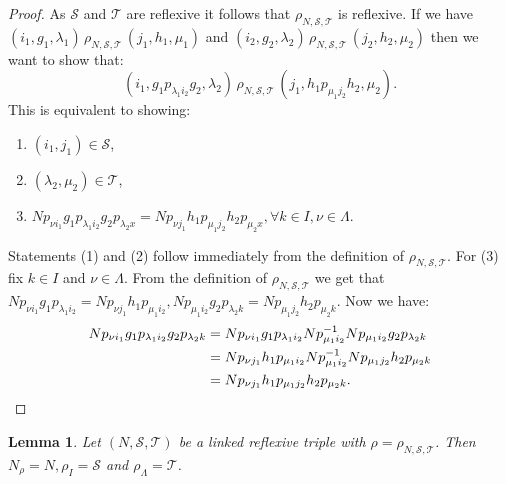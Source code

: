 \documentclass[a4paper, 12pt,reqno]{amsart}
\theoremstyle{plain}
\newtheorem{lemma}[thm]{Lemma}
\theoremstyle{definition}
\theoremstyle{remark}
\newcommand{\normspace}[1]{\, #1 \,}
\begin{document}
\begin{proof}
    As $\mathcal{S}$ and $\mathcal{T}$ are reflexive it follows that $\rho_{N ,\mathcal{S},\mathcal{T}}$ is reflexive.
    If we have $(i_1,g_1,\lambda_1) \normspace{\rho_{N ,\mathcal{S},\mathcal{T}}} (j_1 , h_1 , \mu_1)$ and $(i_2,g_2,\lambda_2) \normspace{\rho_{N ,\mathcal{S},\mathcal{T}}} (j_2,h_2,\mu_2)$ then we want to show that:
    \begin{equation*}
        (i_1,g_1 p_{\lambda_1 i_2} g_2 , \lambda_2) \normspace{\rho_{N ,\mathcal{S},\mathcal{T}}} (j_1 , h_1 p_{\mu_1 j_2} h_2 , \mu_2).
    \end{equation*}
    This is equivalent to showing:
    \begin{enumerate}
        \item $(i_1,j_1) \in \mathcal{S}$,
        \item $(\lambda_2 , \mu_2) \in \mathcal{T}$,
        \item $Np_{\nu i_1} g_1 p_{\lambda_1 i_2} g_2 p_{\lambda_2 x} =Np_{\nu j_1} h_1 p_{\mu_1 j_2} h_2 p_{\mu_2 x}, \forall k \in I , \nu \in \Lambda$.
    \end{enumerate}
    Statements (1) and (2) follow immediately from the definition of $\rho_{N ,\mathcal{S},\mathcal{T}}$.
    For (3) fix $k \in I$ and $\nu \in \Lambda$. 
    From the definition of $\rho_{N,\mathcal{S},\mathcal{T}}$ we get that $Np_{\nu i_1}g_1p_{\lambda_1 i_2} =Np_{\nu j_1} h_1 p_{\mu_1 i_2} ,Np_{\mu_1 i_2}g_2p_{\lambda_2 k} =Np_{\mu_1 j_2} h_2 p_{\mu_2 k}$.
    Now we have:
    \begin{align*}
        Np_{\nu i_1} g_1 p_{\lambda_1 i_2} g_2 p_{\lambda_2 k}& = Np_{\nu i_1} g_1 p_{\lambda_1 i_2}Np_{\mu_1 i_2}^{-1} 
        Np_{\mu_1 i_2}g_2p_{\lambda_2 k} \\
        & = Np_{\nu j_1} h_1 p_{\mu_1 i_2} Np_{\mu_1 i_2}^{-1}Np_{\mu_1 j_2} h_2 p_{\mu_2 k}\\
        & = Np_{\nu j_1} h_1 p_{\mu_1 j_2} h_2 p_{\mu_2 k}.\qedhere
    \end{align*}
\end{proof}

\begin{lemma}
    Let $(N , \mathcal{S} , \mathcal{T})$ be a linked reflexive triple with $\rho = \rho_{N ,\mathcal{S},\mathcal{T}}$.
    Then $N_\rho = N , \rho_I  = \mathcal{S}$ and $\rho_\Lambda = \mathcal{T}$.
\end{lemma}
\end{document}
